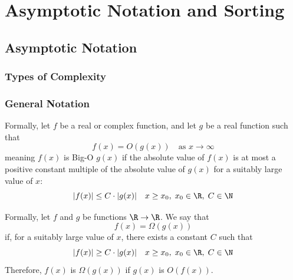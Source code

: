 \section{Asymptotic Notation and Sorting}\label{ads:section:2.ans}

\subsection{Asymptotic Notation}

\subsubsection{Types of Complexity}




\subsubsection{General Notation}

 Formally, let \(f\) be a real or complex function, and let \(g\) be a real function such that
\begin{equation}
    f(x) = O(g(x)) \quad\text{as } x \rightarrow \infty
\end{equation}
meaning \(f(x)\) is Big-O \(g(x)\) if the absolute value of \(f(x)\) is at most a positive constant multiple of the absolute value of \(g(x)\) for a suitably large value of \(x\):
\begin{equation}
    |f(x)| \leq C \cdot |g(x)| \quad x \geq x_0, \; x_0 \in \R, \; C \in \N
\end{equation}

 Formally, let \(f\) and \(g\) be functions \(\R \rightarrow \R\). We say that 
\begin{equation}
    f(x) = \Omega(g(x))
\end{equation}
if, for a suitably large value of \(x\), there exists a constant \(C\) such that
\begin{equation}
    |f(x)| \geq C \cdot |g(x)| \quad x \geq x_0, \; x_0 \in \R, \; C \in \N
\end{equation}
Therefore, \(f(x)\) is \(\Omega(g(x))\) if \(g(x)\) is \(O(f(x))\).

